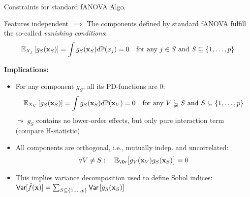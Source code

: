 \documentclass[10pt,compress,t,notes=noshow, xcolor=table]{beamer}
\begin{document}
\begin{frame}{Constraints for standard fANOVA Algo.}

    \begin{theorem}
    
        Features independent $\implies$ The components defined by standard fANOVA fulfill the so-called \textit{vanishing conditions}:
        \begin{align*}
            \mathbb{E}_{X_j}\left[ g_{S}(\mathbf{x}_S) \right]
            = \int g_{S}(\mathbf{x}_S) d \mathbb{P}(x_j) = 0 \quad \text{for any } j \in S \text{ and } S \subseteq \{1, \ldots, p\}
        \end{align*}
    \end{theorem}


    
    \pause 
    \textbf{Implications:}
    \begin{itemize}
        \item 
        For any component $g_{S}$, all its PD-functions are 0:
        $$
        \mathbb{E}_{X_V}\left[ g_{S}(\mathbf{x}_S) \right]
        = \int g_{S}(\mathbf{x}_S) d \mathbb{P}(\mathbf{x}_V) = 0 \quad \text{for any } V \subsetneqq S \text{ and } S \subseteq \{1, \ldots, p\}
        $$
        $\leadsto$ $g_{S}$ contains no lower-order effects, but only pure interaction term \\
        (compare H-statistic)
        \pause
        \item All components are orthogonal, i.e., mutually indep. and uncorrelated:
        $$
        \forall V \neq S: \quad \mathbb{E}_{\Xv} \bigl[ g_{V}(\xv_V) g_{S}(\xv_S) \bigr] = 0
        $$
        \item This implies variance decomposition used to define Sobol indices:
    $ \mathsf{Var}[ \hat{f}(\mathbf{x}) ] =  \textstyle\sum_{S \subseteq \{1,\ldots,p\}}  \mathsf{Var} \left[ g_{S}(\mathbf{x}_S) \right]$
    \end{itemize}
    
\end{frame}
\end{document}
